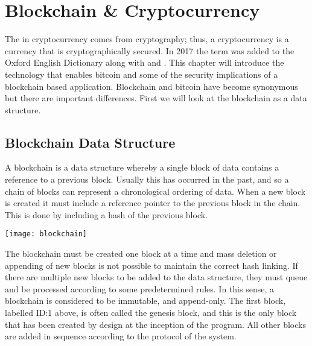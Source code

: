 %
\chapter{Blockchain \& Cryptocurrency}\label{Ch:BC}
The  in cryptocurrency comes from cryptography; thus, a cryptocurrency is a currency that is cryptographically secured. In 2017 the term  was added to the Oxford English Dictionary along with  and . This chapter will introduce the technology that enables bitcoin and some of the security implications of a blockchain based application. Blockchain and bitcoin have become synonymous but there are important differences. First we will look at the blockchain as a data structure.
\section{Blockchain Data Structure}\label{Se:BCDataStructure}
A blockchain is a data structure whereby a single block of data contains a reference to a previous block. Usually this has occurred in the past, and so a chain of blocks can represent a chronological ordering of data. When a new block is created it must include a reference pointer to the previous block in the chain. This is done by including a hash of the previous block.
\begin{center}
\texttt{[image: blockchain]}
\end{center}
The blockchain must be created one block at a time and mass deletion or appending of new blocks is not possible to maintain the correct hash linking. If there are multiple new blocks to be added to the data structure, they must queue and be processed according to some predetermined rules. In this sense, a blockchain is considered to be immutable, and append-only. The first block, labelled ID:1 above, is often called the genesis block, and this is the only block that has been created by design at the inception of the program. All other blocks are added in sequence according to the protocol of the system.
 
